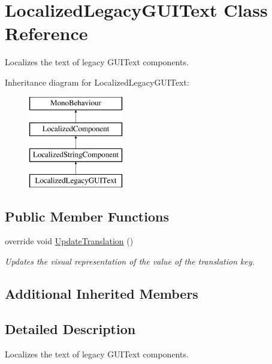 \hypertarget{class_localized_legacy_g_u_i_text}{}\section{Localized\+Legacy\+G\+U\+I\+Text Class Reference}
\label{class_localized_legacy_g_u_i_text}


Localizes the text of legacy G\+U\+I\+Text components.  


Inheritance diagram for Localized\+Legacy\+G\+U\+I\+Text\+:\begin{figure}[H]
\begin{center}
\leavevmode
\includegraphics[height=4.000000cm]{class_localized_legacy_g_u_i_text}
\end{center}
\end{figure}
\subsection*{Public Member Functions}
\begin{DoxyCompactItemize}
\item 
override void \hyperlink{class_localized_legacy_g_u_i_text_a42556fb682d4e45278db74ce52c93c49}{Update\+Translation} ()
\begin{DoxyCompactList}\small\item\em Updates the visual representation of the value of the translation key. \end{DoxyCompactList}\end{DoxyCompactItemize}
\subsection*{Additional Inherited Members}


\subsection{Detailed Description}
Localizes the text of legacy G\+U\+I\+Text components. 



